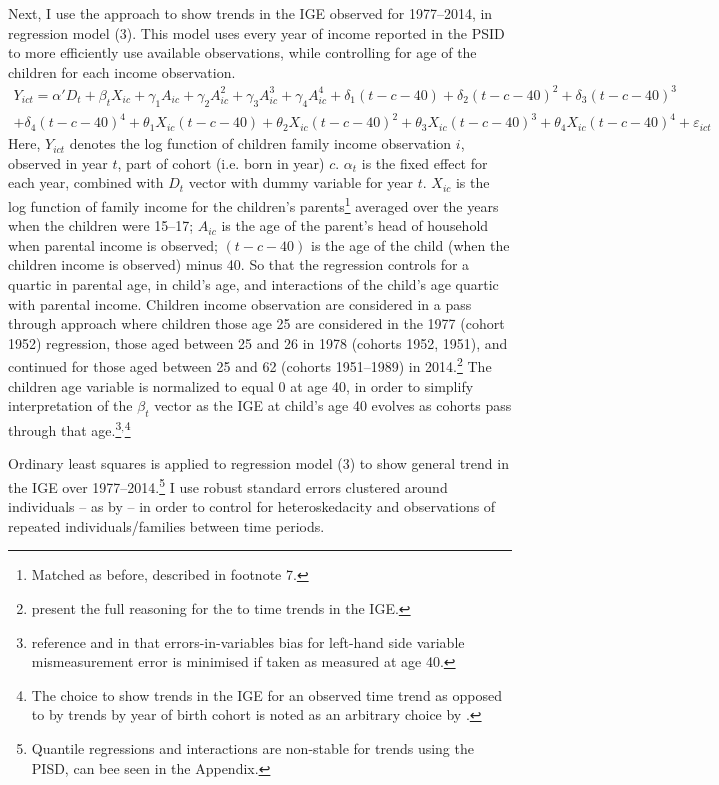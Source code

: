 \documentclass[notitlepage,12pt]{article}
\begin{document}
Next, I use the \cite{lee2009trends} approach to show trends in the IGE observed for 1977--2014, in regression model (3).  This model uses every year of income reported in the PSID to more efficiently use available observations, while controlling for age of the children for each income observation.
\begin{multline}
Y_{ict}=\alpha'D_t
+ \beta_t X_{ic} 
+ \gamma_1 A_{ic}  
+ \gamma_2 A_{ic}^2
+ \gamma_3 A_{ic}^3 
+ \gamma_4 A_{ic}^4
+ \delta_1 (t-c-40)
+ \delta_2 (t-c-40)^2
+ \delta_3 (t-c-40)^3  \\  
+ \delta_4 (t-c-40)^4
+ \theta_1 X_{ic} (t-c-40)
+ \theta_2 X_{ic} (t-c-40)^2
+ \theta_3 X_{ic} (t-c-40)^3
+ \theta_4 X_{ic} (t-c-40)^4
+ \varepsilon_{ict}
\end{multline} 
Here, $Y_{ict}$ denotes the log function of children family income observation $i$, observed in year $t$, part of cohort (i.e. born in year) $c$.  $\alpha_t$ is the fixed effect for each year, combined with $D_t$ vector with dummy variable for year $t$.  $X_{ic}$ is the log function of family income for the children's parents\footnote{Matched as before, described in footnote 7.} averaged over the years when the children were 15--17; $A_{ic}$ is the age of the parent's head of household when parental income is observed;  $(t-c-40)$ is the age of the child (when the children income is observed) minus 40.  So that the regression controls for a quartic in parental age, in child’s age, and interactions of the child’s age quartic with parental income.  Children income observation are considered in a pass through approach where children those age 25 are considered in the 1977 (cohort 1952) regression, those aged between 25 and 26 in 1978  (cohorts 1952, 1951), and continued for those aged between 25 and 62 (cohorts 1951--1989) in 2014.\footnote{\cite{lee2009trends} present the full reasoning for the to time trends in the IGE.}  The children age variable is normalized to equal 0 at age 40, in order to  simplify interpretation of the $\beta_t$ vector as the IGE at child’s age 40 evolves as cohorts pass through that age.\footnote{\cite{lee2009trends} reference \cite{Haider2007} and \cite{bohlmark2006life} in that errors-in-variables bias for left-hand side variable mismeasurement error is minimised if taken as measured at age 40.}$^,$\footnote{The choice to show trends in the IGE for an observed time trend as opposed to by trends by year of birth cohort is noted as an arbitrary choice by \cite{lee2009trends}.}  

Ordinary least squares is applied to regression model (3) to show general trend in the IGE over 1977--2014.\footnote{Quantile regressions and interactions are non-stable for trends using the PISD, can bee seen in the Appendix.}  I use robust standard errors clustered around individuals -- as by \cite{lee2009trends}  -- in order to control for heteroskedacity and observations of repeated individuals/families between time periods.
\end{document}
